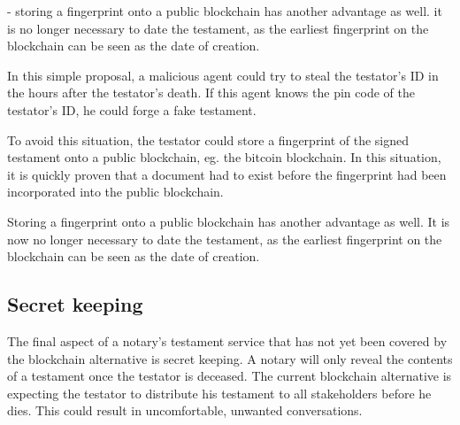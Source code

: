 - storing a fingerprint onto a public blockchain has another advantage as well. it is no longer necessary to date the testament, as the earliest fingerprint on the blockchain can be seen as the date of creation.
\fi

In this simple proposal, a malicious agent could try to steal the testator's ID in the hours after the testator's death. If this agent knows the pin code of the testator's ID, he could forge a fake testament.

To avoid this situation, the testator could store a fingerprint of the signed testament onto a public blockchain, eg. the bitcoin blockchain. In this situation, it is quickly proven that a document had to exist before the fingerprint had been incorporated into the public blockchain. 

Storing a fingerprint onto a public blockchain has another advantage as well. It is now no longer necessary to date the testament, as the earliest fingerprint on the blockchain can be seen as the date of creation.

\subsection{Secret keeping}

\iffalse
secret keeping

- The final aspect of a notary's testament service that has not yet been covered by the blockchain alternative is secret keeping. In general, a notary will only reveal the contents of a testament once the testator is deceased. The current blockchain alternative is expecting the testator to distribute his testament to all stakeholders before he dies. This could result in some uncomfortable conversations.

- An ethereum script could solve this final aspect. Instead of distributing the testament, the testator could distribute an encrypted version of the testament instead. He could then store the key to decrypt the testament into a script on the ethereum blockchain. This script would only release the decryption key once the testator has deceased. There are several ways for this script to determine whether the testator is effectively deceased. For example, the testator could distribute keys to family and friends. These keyholders can then vote to release the decryption key, with the testator a veto. Another solution could routinely ask a public governmental database whether the testator has been declared deceased.
\fi

The final aspect of a notary's testament service that has not yet been covered by the blockchain alternative is secret keeping. A notary will only reveal the contents of a testament once the testator is deceased. The current blockchain alternative is expecting the testator to distribute his testament to all stakeholders before he dies. This could result in uncomfortable, unwanted conversations.

